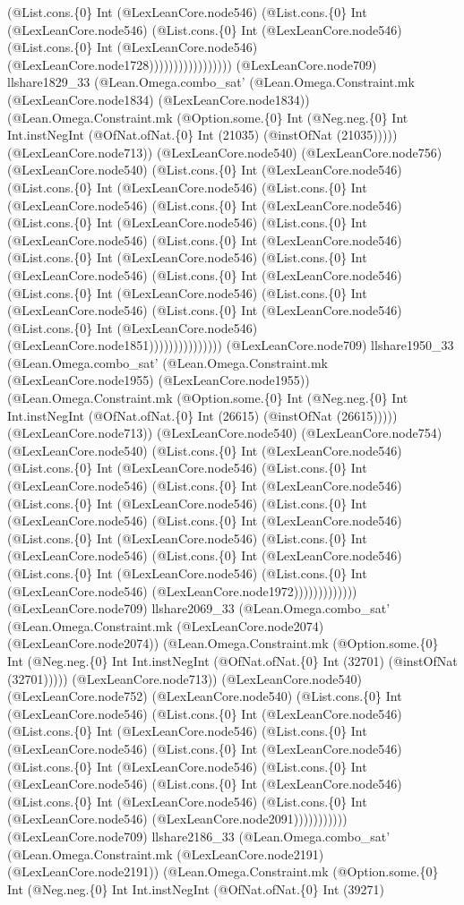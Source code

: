 \documentclass[11pt]{article}
\begin{document}
(@List.cons.\{0\} Int (@LexLeanCore.node546) (@List.cons.\{0\} Int (@LexLeanCore.node546) (@List.cons.\{0\} Int (@LexLeanCore.node546) (@List.cons.\{0\} Int (@LexLeanCore.node546) (@LexLeanCore.node1728))))))))))))))))) (@LexLeanCore.node709) llshare1829\_33 (@Lean.Omega.combo\_sat' (@Lean.Omega.Constraint.mk (@LexLeanCore.node1834) (@LexLeanCore.node1834)) (@Lean.Omega.Constraint.mk (@Option.some.\{0\} Int (@Neg.neg.\{0\} Int Int.instNegInt (@OfNat.ofNat.\{0\} Int (21035) (@instOfNat (21035))))) (@LexLeanCore.node713)) (@LexLeanCore.node540) (@LexLeanCore.node756) (@LexLeanCore.node540) (@List.cons.\{0\} Int (@LexLeanCore.node546) (@List.cons.\{0\} Int (@LexLeanCore.node546) (@List.cons.\{0\} Int (@LexLeanCore.node546) (@List.cons.\{0\} Int (@LexLeanCore.node546) (@List.cons.\{0\} Int (@LexLeanCore.node546) (@List.cons.\{0\} Int (@LexLeanCore.node546) (@List.cons.\{0\} Int (@LexLeanCore.node546) (@List.cons.\{0\} Int (@LexLeanCore.node546) (@List.cons.\{0\} Int (@LexLeanCore.node546) (@List.cons.\{0\} Int (@LexLeanCore.node546) (@List.cons.\{0\} Int (@LexLeanCore.node546) (@List.cons.\{0\} Int (@LexLeanCore.node546) (@List.cons.\{0\} Int (@LexLeanCore.node546) (@List.cons.\{0\} Int (@LexLeanCore.node546) (@LexLeanCore.node1851))))))))))))))) (@LexLeanCore.node709) llshare1950\_33 (@Lean.Omega.combo\_sat' (@Lean.Omega.Constraint.mk (@LexLeanCore.node1955) (@LexLeanCore.node1955)) (@Lean.Omega.Constraint.mk (@Option.some.\{0\} Int (@Neg.neg.\{0\} Int Int.instNegInt (@OfNat.ofNat.\{0\} Int (26615) (@instOfNat (26615))))) (@LexLeanCore.node713)) (@LexLeanCore.node540) (@LexLeanCore.node754) (@LexLeanCore.node540) (@List.cons.\{0\} Int (@LexLeanCore.node546) (@List.cons.\{0\} Int (@LexLeanCore.node546) (@List.cons.\{0\} Int (@LexLeanCore.node546) (@List.cons.\{0\} Int (@LexLeanCore.node546) (@List.cons.\{0\} Int (@LexLeanCore.node546) (@List.cons.\{0\} Int (@LexLeanCore.node546) (@List.cons.\{0\} Int (@LexLeanCore.node546) (@List.cons.\{0\} Int (@LexLeanCore.node546) (@List.cons.\{0\} Int (@LexLeanCore.node546) (@List.cons.\{0\} Int (@LexLeanCore.node546) (@List.cons.\{0\} Int (@LexLeanCore.node546) (@List.cons.\{0\} Int (@LexLeanCore.node546) (@LexLeanCore.node1972))))))))))))) (@LexLeanCore.node709) llshare2069\_33 (@Lean.Omega.combo\_sat' (@Lean.Omega.Constraint.mk (@LexLeanCore.node2074) (@LexLeanCore.node2074)) (@Lean.Omega.Constraint.mk (@Option.some.\{0\} Int (@Neg.neg.\{0\} Int Int.instNegInt (@OfNat.ofNat.\{0\} Int (32701) (@instOfNat (32701))))) (@LexLeanCore.node713)) (@LexLeanCore.node540) (@LexLeanCore.node752) (@LexLeanCore.node540) (@List.cons.\{0\} Int (@LexLeanCore.node546) (@List.cons.\{0\} Int (@LexLeanCore.node546) (@List.cons.\{0\} Int (@LexLeanCore.node546) (@List.cons.\{0\} Int (@LexLeanCore.node546) (@List.cons.\{0\} Int (@LexLeanCore.node546) (@List.cons.\{0\} Int (@LexLeanCore.node546) (@List.cons.\{0\} Int (@LexLeanCore.node546) (@List.cons.\{0\} Int (@LexLeanCore.node546) (@List.cons.\{0\} Int (@LexLeanCore.node546) (@List.cons.\{0\} Int (@LexLeanCore.node546) (@LexLeanCore.node2091))))))))))) (@LexLeanCore.node709) llshare2186\_33 (@Lean.Omega.combo\_sat' (@Lean.Omega.Constraint.mk (@LexLeanCore.node2191) (@LexLeanCore.node2191)) (@Lean.Omega.Constraint.mk (@Option.some.\{0\} Int (@Neg.neg.\{0\} Int Int.instNegInt (@OfNat.ofNat.\{0\} Int (39271) 
\end{document}
